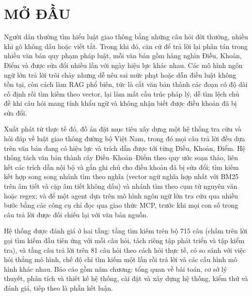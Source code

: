 \chapter*{MỞ ĐẦU}

Người dân thường tìm hiểu luật giao thông bằng những câu hỏi đời thường, nhiều khi gõ không dấu hoặc viết tắt. Trong khi đó, căn cứ để trả lời lại phân tán trong nhiều văn bản quy phạm pháp luật, mỗi văn bản gồm hàng nghìn Điều, Khoản, Điểm và được sửa đổi nhiều lần với ngày hiệu lực khác nhau. Các mô hình ngôn ngữ lớn trả lời trôi chảy nhưng dễ nêu sai mức phạt hoặc dẫn điều luật không tồn tại, còn cách làm RAG phổ biến, tức là cắt văn bản thành các đoạn có độ dài cố định rồi tìm kiếm theo vector, lại làm mất cấu trúc pháp lý, dễ tìm lệch chủ đề khi câu hỏi mang tính khẩu ngữ và không nhận biết được điều khoản đã bị sửa đổi.

Xuất phát từ thực tế đó, đồ án đặt mục tiêu xây dựng một hệ thống tra cứu và hỏi đáp về luật giao thông đường bộ Việt Nam, trong đó mọi câu trả lời đều dựa trên văn bản đang có hiệu lực và trích dẫn được tới từng Điều, Khoản, Điểm. Hệ thống tách văn bản thành cây Điều--Khoản--Điểm theo quy ước soạn thảo, liên kết các trích dẫn nội bộ và gắn ghi chú cho điều khoản đã bị sửa đổi; tìm kiếm kết hợp song song nhánh tìm theo nghĩa (vector ngữ nghĩa hợp nhất với BM25 trên âm tiết và cặp âm tiết không dấu) và nhánh tìm theo cụm từ nguyên văn hoặc regex; và để một agent dựa trên mô hình ngôn ngữ lớn tra cứu qua nhiều bước bằng các công cụ chỉ đọc qua giao thức MCP, trước khi mọi con số trong câu trả lời được đối chiếu lại với văn bản nguồn.

Hệ thống được đánh giá ở hai tầng: tầng tìm kiếm trên bộ 715 câu (chấm trên lời gọi tìm kiếm đầu tiên ứng với mỗi câu hỏi, tách riêng tập phát triển và tập kiểm tra), và tầng câu trả lời trên 81 câu hỏi theo cách hỏi thực tế, có so sánh với việc hỏi thẳng mô hình, chế độ chỉ tìm kiếm một lần rồi trả lời và các cấu hình mô hình khác nhau. Báo cáo gồm năm chương: tổng quan về bài toán, cơ sở lý thuyết, phân tích và thiết kế hệ thống, cài đặt và xây dựng hệ thống, kiểm thử và đánh giá, tiếp theo là phần kết luận.
